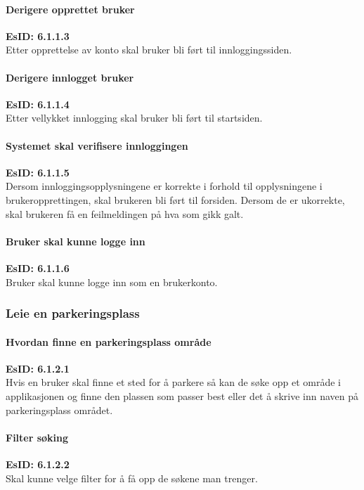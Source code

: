 \documentclass[12pt]{article}
\begin{document}
            \paragraph{Derigere opprettet bruker}
            \textbf{EsID: 6.1.1.3}\\Etter opprettelse av konto skal bruker bli ført til innloggingssiden.

            \paragraph{Derigere innlogget bruker}
            \textbf{EsID: 6.1.1.4}\\Etter vellykket innlogging skal bruker bli ført til startsiden.

            \paragraph{Systemet skal verifisere innloggingen}
            \textbf{EsID: 6.1.1.5}\\Dersom innloggingsopplysningene er korrekte i forhold til opplysningene i brukeropprettingen, skal brukeren bli ført til forsiden. Dersom de er ukorrekte, skal brukeren få en feilmeldingen på hva som gikk galt.

            \paragraph{Bruker skal kunne logge inn}
            \textbf{EsID: 6.1.1.6}\\Bruker skal kunne logge inn som en brukerkonto.
        
        \subsubsection{Leie en parkeringsplass}

            \paragraph{Hvordan finne en parkeringsplass område}
            \textbf{EsID: 6.1.2.1}\\Hvis en bruker skal finne et sted for å parkere så kan de søke opp et område i applikasjonen og finne den plassen som passer best eller det å skrive inn naven på parkeringsplass området.

            \paragraph{Filter søking}
            \textbf{EsID: 6.1.2.2}\\Skal kunne velge filter for å få opp de søkene man trenger.
\end{document}
